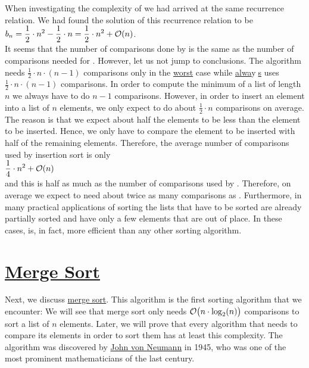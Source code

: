 When investigating the complexity of  we had arrived at the same recurrence
relation. We had found the solution of this recurrence relation to be
\\[0.2cm]
\hspace*{1.3cm} $\displaystyle b_n = \frac{1}{2} \cdot n^2 - \frac{1}{2}\cdot n = \frac{1}{2} \cdot n^2 +
\mathcal{O}(n)$. 
\\[0.2cm]
It seems that the number of comparisons done by  is the same as the number of
comparisons needed for .  However, let us not jump to conclusions.
The algorithm  needs
$\frac{1}{2}\cdot n \cdot (n-1)$ comparisons only in the \underline{worst} case while 
\underline{alwa}y$\!\!$\underline{$\;$s} uses $\frac{1}{2} \cdot n\cdot(n-1)$ comparisons.
In order to compute the minimum of a list of length $n$ we always have to do $n-1$ comparisons.
However, in order to insert an element into a list of $n$ elements, we only expect to do about
$\frac{1}{2} \cdot n$ comparisons on average.  The reason is that we expect about half the elements  to
be less than the element to be inserted.  Hence, we only have to compare the element to be inserted
with half of the remaining elements.  Therefore, the average number of comparisons used by
insertion sort is only
\\[0.2cm]
\hspace*{1.3cm}
 $\displaystyle \frac{1}{4} \cdot n^2 + \mathcal{O}(n)$
\\[0.2cm]
and this is half as much as the number of comparisons used by .  Therefore, on
average we expect  to need about twice as many comparisons as .
Furthermore,  in many practical applications of sorting the lists that have to be sorted are already
partially sorted and have only a few elements that are out of place.  In these cases,
 is, in fact,  more efficient than any other sorting algorithm.


\section{\href{http://en.wikipedia.org/wiki/Merge_sort}{Merge Sort}}
Next, we discuss \href{https://en.wikipedia.org/wiki/Merge_sort}{merge sort}.  This algorithm
is the first  sorting algorithm that we encounter: We will see that merge sort 
only needs $\mathcal{O}\bigl(n \cdot \log_2(n)\bigr)$ comparisons to sort a list of $n$ elements.  Later, we will prove
that every algorithm that needs to compare its elements in order to sort them has at least this complexity.  
The  algorithm was discovered by
\href{http://en.wikipedia.org/wiki/John_von_Neumann}{John von Neumann} in 1945, who 
was one of the most prominent mathematicians of the last century.  

